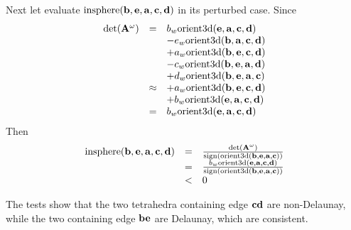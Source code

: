 Next let evaluate $\textrm{insphere}({\bf b},{\bf e},{\bf a},{\bf c},{\bf d})$ in its perturbed case. Since
\[
\begin{array}{rcl}
\textrm{det}({\bf A}^{\omega}) &=&
b_w\textrm{orient3d}({\bf e},{\bf a},{\bf c},{\bf d})\\
& & -e_w\textrm{orient3d}({\bf b},{\bf a},{\bf c},{\bf d})\\
& & +a_w\textrm{orient3d}({\bf b},{\bf e},{\bf c},{\bf d})\\
& & -c_w\textrm{orient3d}({\bf b},{\bf e},{\bf a},{\bf d})\\
& & +d_w\textrm{orient3d}({\bf b},{\bf e},{\bf a},{\bf c})\\
&\approx& +a_w\textrm{orient3d}({\bf b},{\bf e},{\bf c},{\bf d})\\
& & +b_w\textrm{orient3d}({\bf e},{\bf a},{\bf c},{\bf d})\\
&=& b_w\textrm{orient3d}({\bf e},{\bf a},{\bf c},{\bf d})
\end{array}
\]
Then
\[
\begin{array}{rcl}
\textrm{insphere}({\bf b},{\bf e},{\bf a},{\bf c},{\bf d}) &=&
\frac{\textrm{det}({\bf A}^{\omega})}{\textrm{sign}\left(\textrm{orient3d}({\bf b},{\bf e},{\bf a},{\bf c})\right)}\\
&=& \frac{b_w\textrm{orient3d}({\bf e},{\bf a},{\bf c},{\bf d})}{\textrm{sign}\left(\textrm{orient3d}({\bf b},{\bf e},{\bf a},{\bf c})\right)}\\
&<& 0
\end{array}
\]

The tests show that the two tetrahedra containing edge ${\bf cd}$ are non-Delaunay, while the two containing edge ${\bf be}$ are Delaunay, which are consistent. 